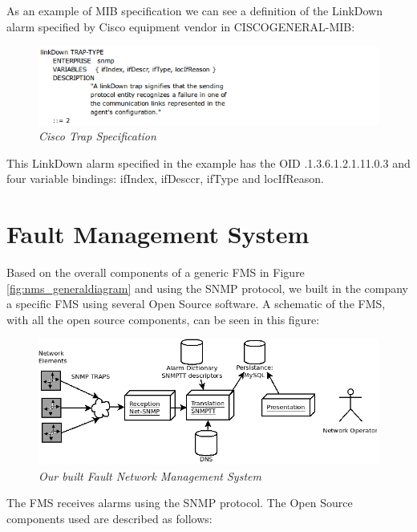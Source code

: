 \documentclass[10pt,a4paper]{report}
\begin{document}
\newpage
As an example of MIB specification we can see a definition of the LinkDown alarm specified by Cisco equipment vendor in CISCOGENERAL-MIB\cite{ciscoGeneralTraps}:

\begin{figure}[H]
 \includegraphics[scale=0.4]{ciscoTrapLinkDown.png}
  \centering
  \caption{\textit{Cisco Trap Specification}}
  \label{fig:snmp_mib_example}
\end{figure}	

This LinkDown alarm specified in the example has the OID .1.3.6.1.2.1.11.0.3 and four variable bindings: ifIndex, ifDesccr, ifType and locIfReason.

\chapter{Fault Management System}

Based on the overall components of a generic FMS in Figure \ref{fig:nms_generaldiagram} and using the SNMP protocol, we built in the company a specific FMS using several Open Source software. A schematic of the FMS, with all the open source components, can be seen in this figure:

\begin{figure}[H]
 \includegraphics[scale=0.4]{ACC_FMS.png}
  \centering
  \caption{\textit{Our built Fault Network Management System}}
  \label{fig:acc_fms}
\end{figure}	


The FMS receives alarms using the SNMP protocol. The Open Source components used are described as follows:
\end{document}

